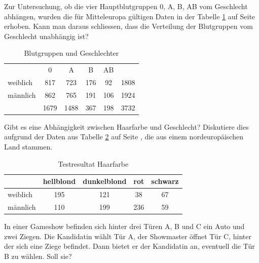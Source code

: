 \documentclass[%
11pt,%
twoside,%
titlepage,%
german,%
headsepline%
]{scrartcl}
\newcommand{\spaltenheight}{\rule{0mm}{3ex}}
\newcommand{\spaltensep}{\\[1ex]}
\begin{document}
\begin{ueb}
Zur Untersuchung, ob die vier Hauptblutgruppen 0, A, B, AB vom Geschlecht abhängen, wurden die für Mitteleuropa gültigen Daten in der Tabelle \ref{blutgrp} auf Seite \pageref{blutgrp} erhoben. Kann man daraus schliessen, dass die Verteilung der Blutgruppen vom Geschlecht unabhängig ist?

\begin{table}[h]
\begin{center}
\begin{tabular}{|l|c|c|c|c||c|}
\hline
\rowcolor{Gray}\spaltenheight & 0 & A & B & AB & \spaltensep \hhline{|-|-|-|-|--|}
\rowcolor{lightyellow}\spaltenheight  weiblich & 817 & 723 & 176 & 92 & 1808\spaltensep \hhline{|-|-|-|-|--|}
\rowcolor{Gray}\spaltenheight  männlich & 862 & 765 & 191 & 106 & 1924\spaltensep \hhline{|=|=|=|=|=#=|}
\rowcolor{lightyellow}\spaltenheight   & 1679 & 1488 & 367 & 198 & 3732\spaltensep \hline
\end{tabular}
\end{center}
\caption{Blutgruppen und Geschlechter}\label{blutgrp}
\end{table}
\end{ueb}

\begin{ueb}
Gibt
es eine Abhängigkeit zwischen Haarfarbe und Geschlecht? Diskutiere dies aufgrund der Daten aus Tabelle \ref{Haarfarbe} auf Seite \pageref{Haarfarbe}, die aus einem nordeuropäischen Land stammen.

\begin{table}[h]
\begin{center}
\begin{tabular}{|l|c|c|c|c|}
\hline
\rowcolor{Gray}\spaltenheight & hellblond & dunkelblond & rot & schwarz\spaltensep \hline
\rowcolor{lightyellow}\spaltenheight  weiblich & 195 & 121 & 38 & 67\spaltensep \hline
\rowcolor{Gray}\spaltenheight  männlich & 110 & 199 & 236 & 59\spaltensep \hline
\end{tabular}
\end{center}
\caption{Testresultat Haarfarbe}\label{Haarfarbe}
\end{table}
\end{ueb}

\begin{ueb}[Ziegenproblem]
In
einer Gameshow befinden sich hinter drei Türen A, B und C ein Auto und zwei Ziegen. Die Kandidatin wählt Tür A, der Showmaster öffnet Tür C, hinter der sich eine Ziege befindet. Dann bietet er der Kandidatin an, eventuell die Tür B zu wählen. Soll sie?
\end{ueb}
\end{document}
